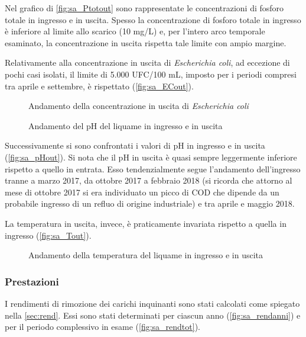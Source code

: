 Nel grafico di \autoref{fig:sa_Ptotout} sono rappresentate le concentrazioni di fosforo totale in ingresso e in uscita.
Spesso la concentrazione di fosforo totale in ingresso è inferiore al limite allo scarico (10 mg/L) e, per l’intero arco temporale esaminato, la concentrazione in uscita rispetta tale limite con ampio margine.

Relativamente alla concentrazione in uscita di \textit{Escherichia coli}, ad eccezione di pochi casi isolati, il limite di 5.000 UFC/100 mL, imposto per i periodi compresi tra aprile e settembre, è rispettato (\autoref{fig:sa_ECout}).
\begin{figure}[H]
		\centering
	\caption{Andamento della concentrazione in uscita di \textit{Escherichia coli}}
	\label{fig:sa_ECout}
\end{figure}
\begin{figure}[H]
		\centering
	\caption{Andamento del pH del liquame in ingresso e in uscita}
	\label{fig:sa_pHout}
\end{figure}

Successivamente si sono confrontati i valori di pH in ingresso e in uscita (\autoref{fig:sa_pHout}).
Si nota che il pH in uscita è quasi sempre leggermente inferiore rispetto a quello in entrata. Esso tendenzialmente segue l’andamento dell’ingresso tranne a marzo 2017, da ottobre 2017 a febbraio 2018 (si ricorda che attorno al mese di ottobre 2017 si era individuato un picco di COD che dipende da un probabile ingresso di un refluo di origine industriale) e tra aprile e maggio 2018.

La temperatura in uscita, invece, è praticamente invariata rispetto a quella in ingresso (\autoref{fig:sa_Tout}).

\begin{figure}[H]
		\centering
	\caption{Andamento della temperatura del liquame in ingresso e in uscita}
	\label{fig:sa_Tout}
\end{figure}

\subsubsection{Prestazioni}
I rendimenti di rimozione dei carichi inquinanti sono stati calcolati come spiegato nella \autoref{sec:rend}.
Essi sono stati determinati per ciascun anno (\autoref{fig:sa_rendanni}) e per il periodo complessivo in esame (\autoref{fig:sa_rendtot}).

